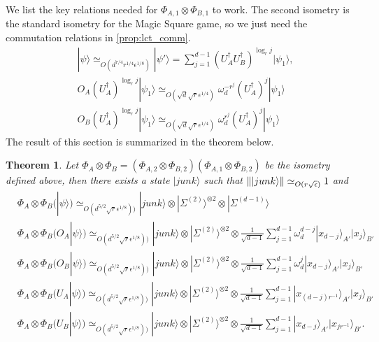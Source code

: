 \documentclass[11pt,letterpaper]{article}
\newcommand{\ket}[1]{|#1\rangle}
\newcommand{\x}{\otimes}
\newcommand{\ct}{^{\dagger}}
\DeclarePairedDelimiter{\norm}{\lVert}{\rVert}
\newcommand{\1}{\mathbb{1}}
\newcommand{\EPR}[1]{\Sigma^{(#1)}}
\newcommand{\ep}{\epsilon}
\newcommand{\se}{\sqrt{\epsilon}}
\newcommand{\qe}{\epsilon^{1/4}}
\newcommand{\sd}{\sqrt{d}}
\newcommand{\sr}{\sqrt{r}}
\newcommand{\appd}[1]{\simeq_{#1}}
\newtheorem{theorem}{Theorem}
\theoremstyle{definition}
\begin{document}
We list the key relations needed for $\Phi_{A,1} \x \Phi_{B,1}$ to work.
The second isometry is the standard isometry for the Magic Square game, so we just need the commutation relations in
\cref{prop:lct_comm}.
\begin{align}
	&\ket{\psi} \appd{O(d^{7/4} r^{1/4} \ep^{1/8})}\ket{\psi'} = \sum_{j=1}^{d-1} (U_A\ct U_B\ct)^{\log_r j} \ket{\psi_1},\\
	&O_A(U_A\ct)^{\log_r j} \ket{\psi_1} \appd{O(\sd \sr \qe)}\omega_d^{-r^j}  (U_A\ct)^j \ket{\psi_1}\\
	&O_B(U_A\ct)^{\log_r j} \ket{\psi_1} \appd{O(\sd \sr \qe)}\omega_d^{r^j}  (U_A\ct)^j \ket{\psi_1}
\end{align}
The result of this section is summarized in the theorem below.
\begin{theorem}
	Let $\Phi_A \x \Phi_B = (\Phi_{A,2} \x \Phi_{B,2})(\Phi_{A,1}\x\Phi_{B,2})$ be the isometry defined above, then there exists a state $\ket{junk}$
	such that $\norm{\ket{junk}} \appd{O(r\se)} 1$ and 
	\begin{align}
		&\Phi_A \x \Phi_B (\ket{\psi}) \appd{O(d^{5/2}\sr \ep^{1/8}))} \ket{junk} \x \ket{\EPR{2}}^{\x 2} \x \ket{\EPR{d-1}}\\	
		&\Phi_A \x \Phi_B (O_A\ket{\psi}) \appd{O(d^{5/2}\sr \ep^{1/8}))} \ket{junk} \x \ket{\EPR{2}}^{\x 2} \x
		\frac{1}{\sqrt{d-1}}\sum_{j=1}^{d-1} \omega_d^{d-j}\ket{x_{d-j}}_{A'}\ket{x_j}_{B'} \\
		&\Phi_A \x \Phi_B (O_B\ket{\psi}) \appd{O(d^{5/2}\sr \ep^{1/8}))} \ket{junk} \x \ket{\EPR{2}}^{\x 2} \x
		\frac{1}{\sqrt{d-1}}\sum_{j=1}^{d-1} \omega_d^{j}\ket{x_{d-j}}_{A'}\ket{x_j}_{B'}\\
		&\Phi_A \x \Phi_B (U_A\ket{\psi}) \appd{O(d^{5/2}\sr \ep^{1/8}))} \ket{junk} \x \ket{\EPR{2}}^{\x 2} \x
		\frac{1}{\sqrt{d-1}}\sum_{j=1}^{d-1} \ket{x_{(d-j)r^{-1}}}_{A'}\ket{x_j}_{B'} \\
		&\Phi_A \x \Phi_B (U_B\ket{\psi}) \appd{O(d^{5/2}\sr \ep^{1/8}))} \ket{junk} \x \ket{\EPR{2}}^{\x 2} \x
		\frac{1}{\sqrt{d-1}}\sum_{j=1}^{d-1} \ket{x_{d-j}}_{A'}\ket{x_{j r^{-1}}}_{B'}.
	\end{align}
\end{theorem}
\end{document}
